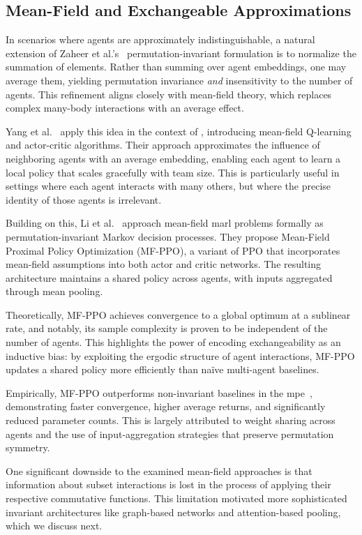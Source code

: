 \subsection{Mean-Field and Exchangeable Approximations}

In scenarios where agents are approximately indistinguishable, 
a natural extension of Zaheer et al.'s~\cite{zaheer2017} 
permutation-invariant formulation is to normalize the summation of elements. 
Rather than summing over agent embeddings, one may average them,
yielding permutation invariance \emph{and} insensitivity to the number of agents. 
This refinement aligns closely with mean-field theory, which replaces complex 
many-body interactions with an average effect.

Yang et al.~\cite{yang2018} apply this idea in the context of , 
introducing mean-field Q-learning and actor-critic algorithms. 
Their approach approximates the influence of neighboring agents with 
an average embedding, enabling each agent to learn a local policy that 
scales gracefully with team size. This is particularly 
useful in settings where each agent interacts with many others, 
but where the precise identity of those agents is irrelevant.

Building on this, Li et al.~\cite{li2021b} approach mean-field \gls{marl} 
problems formally as permutation-invariant Markov decision processes. 
They propose Mean-Field Proximal Policy Optimization (MF-PPO), 
a variant of PPO that incorporates mean-field assumptions into 
both actor and critic networks. The resulting architecture maintains a 
shared policy across agents, with inputs aggregated through mean pooling.

Theoretically, MF-PPO achieves convergence to a global optimum at 
a sublinear rate, and notably, its sample complexity is proven to be 
independent of the number of agents. This highlights the power of 
encoding exchangeability as an inductive bias: by exploiting the 
ergodic structure of agent interactions, MF-PPO updates a shared policy 
more efficiently than na\"ive multi-agent baselines.

Empirically, MF-PPO outperforms non-invariant baselines in the 
\gls{mpe}~\cite{li2021b}, demonstrating faster convergence, 
higher average returns, and significantly reduced parameter counts. 
This is largely attributed to weight sharing across agents and the 
use of input-aggregation strategies that preserve permutation symmetry. 

One significant downside to the examined mean-field approaches is that 
information about subset interactions is lost in the process of 
applying their respective commutative functions.
This limitation motivated more sophisticated invariant architectures like 
graph-based networks and attention-based pooling, which we discuss next.


